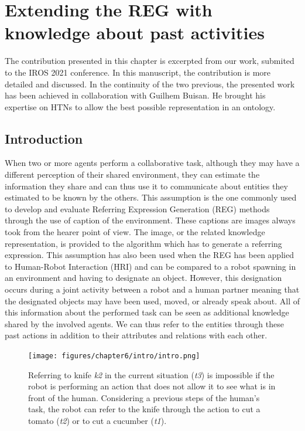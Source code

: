 \ifdefined{}
\else
\setcounter{chapter}{6} %
\dominitoc
\faketableofcontents
\fi

\chapter{Extending the REG with knowledge about past activities}
\minitoc

The contribution presented in this chapter is excerpted from our work, submited to the IROS 2021 conference. In this manuscript, the contribution is more detailed and discussed. In the continuity of the two previous, the presented work has been achieved in collaboration with Guilhem Buisan. He brought his expertise on HTNs to allow the best possible representation in an ontology.

\section{Introduction}

When two or more agents perform a collaborative task, although they may have a different perception of their shared environment, they can estimate the information they share and can thus use it to communicate about entities they estimated to be known by the others. This assumption is the one commonly used to develop and evaluate Referring Expression Generation (REG) methods through the use of caption of the environment\cite{duboue_2015_evaluating}. These captions are images always took from the hearer point of view. The image, or the related knowledge representation, is provided to the algorithm which has to generate a referring expression. This assumption has also been used when the REG has been applied to Human-Robot Interaction (HRI) and can be compared to a robot spawning in an environment and having to designate an object. However, this designation occurs during a joint activity between a robot and a human partner meaning that the designated objects may have been used, moved, or already speak about. All of this information about the performed task can be seen as additional knowledge shared by the involved agents. We can thus refer to the entities through these past actions in addition to their attributes and relations with each other.

\begin{figure}[ht!]
\centering
\texttt{[image: figures/chapter6/intro/intro.png]}
\caption{\label{fig:chap6_intro} Referring to knife \textit{k2} in the current situation (\textit{t3}) is impossible if the robot is performing an action that does not allow it to see what is in front of the human. Considering a previous steps of the human's task, the robot can refer to the knife through the action to cut a tomato (\textit{t2}) or to cut a cucumber (\textit{t1}).}
\end{figure}

